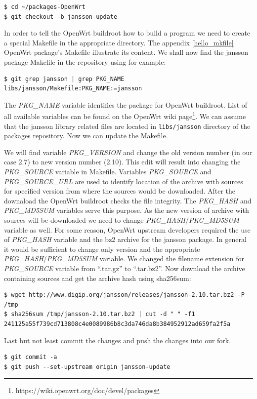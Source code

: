\begin{lstlisting}[columns=fixed,basicstyle=\ttfamily\footnotesize,tabsize=4,backgroundcolor=\color{yellow!10}]
$ cd ~/packages-OpenWrt
$ git checkout -b jansson-update
\end{lstlisting}
In order to tell the OpenWrt buildroot how to build a program we need to create a special Makefile in the appropriate directory.
The appendix \ref{hello_mkfile} OpenWrt package's Makefile illustrate its content.
We shall now find the jansson package Makefile in the repository using for example:
\begin{lstlisting}[columns=fixed,basicstyle=\ttfamily\footnotesize,tabsize=4,backgroundcolor=\color{yellow!10}]
$ git grep jansson | grep PKG_NAME
libs/jansson/Makefile:PKG_NAME:=jansson
\end{lstlisting}
The {\it PKG\_NAME} variable identifies the package for OpenWrt buildroot\cite{creating_pkgs}.
List of all available variables can be found on the OpenWrt wiki page\footnote{https://wiki.openwrt.org/doc/devel/packages}.
We can assume that the jansson library related files are located in {\tt libs/jansson} directory of the packages repository.
Now we can update the Makefile.

We will find variable {\it PKG\_VERSION} and change the old version number (in our case 2.7) to new version number (2.10).
This edit will result into changing the {\it PKG\_SOURCE} variable in Makefile.
Variables {\it PKG\_SOURCE} and {\it PKG\_SOURCE\_URL} are used to identify location of the archive with sources for specified version from where the sources would be downloaded.
After the downaload the OpenWrt buildroot checks the file integrity.
The {\it PKG\_HASH} and {\it PKG\_MD5SUM} variables serve this purpose.
As the new version of archive with sources will be downloaded we need to change {\it PKG\_HASH}/{\it PKG\_MD5SUM} variable as well.
For some reason, OpenWrt upstream developers required the use of {\it PKG\_HASH} variable and the bz2 archive for the jansson package.
In general it would be sufficient to change only version and the appropriate {\it PKG\_HASH}/{\it PKG\_MD5SUM} variable.
We changed the filename extension for {\it PKG\_SOURCE} variable from “.tar.gz” to “.tar.bz2”.
Now download the archive containing sources and get the archive hash using sha256sum:
\begin{lstlisting}[columns=fixed,basicstyle=\ttfamily\footnotesize,tabsize=4,backgroundcolor=\color{yellow!10}]
$ wget http://www.digip.org/jansson/releases/jansson-2.10.tar.bz2 -P /tmp
$ sha256sum /tmp/jansson-2.10.tar.bz2 | cut -d " " -f1
241125a55f739cd713808c4e0089986b8c3da746da8b384952912ad659fa2f5a
\end{lstlisting}
Last but not least commit the changes and push the changes into our fork.
\begin{lstlisting}[columns=fixed,basicstyle=\ttfamily\footnotesize,tabsize=4,backgroundcolor=\color{yellow!10}]
$ git commit -a
$ git push --set-upstream origin jansson-update
\end{lstlisting}

